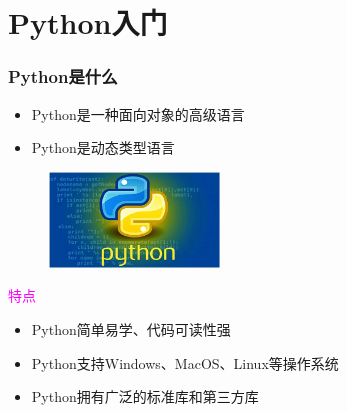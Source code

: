 \small
\section{\rm{Python}入门}
\begin{frame}
	\frametitle{\textrm{Python}是什么}
	\begin{itemize}
		\item \textrm{Python}是一种面向对象的高级语言\\
			{\fontsize{7.2pt}{4.2pt}\selectfont{支持面向对象的风格或代码封装在对象的技术}}
		\item \textrm{Python}是动态类型语言\\
			{\fontsize{7.2pt}{4.2pt}\selectfont{变量类型在运行时确定，代码实现灵活}}
	\end{itemize}
\begin{figure}[h!]
\vspace*{-0.10in}
\centering
\includegraphics[height=1.0in, width=1.8in, viewport=0 0 602 339,clip]{Figures/python-experts.png}
\label{Python-experts}
\end{figure}
\textcolor{magenta}{特点}%
	\begin{itemize}
		\item \textrm{Python}简单易学、代码可读性强
		\item \textrm{Python}支持\textrm{Windows}、\textrm{MacOS}、\textrm{Linux}等操作系统\\
			{\fontsize{7.2pt}{4.2pt}\selectfont{可以在不同的平台上无缝运行，而无需修改代码}}
		\item \textrm{Python}拥有广泛的标准库和第三方库
	\end{itemize}
\end{frame}

